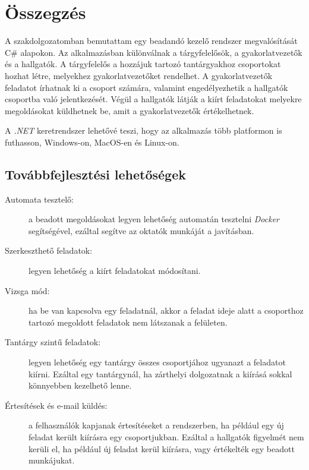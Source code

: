 \chapter{Összegzés} %
\label{ch:sum}
A szakdolgozatomban bemutattam egy beadandó kezelő rendszer megvalósítását C\# alapokon. Az alkalmazásban különválnak a tárgyfelelősök, a gyakorlatvezetők és a hallgatók. A tárgyfelelős a hozzájuk tartozó tantárgyakhoz csoportokat hozhat létre, melyekhez gyakorlatvezetőket rendelhet. A gyakorlatvezetők feladatot írhatnak ki a csoport számára, valamint engedélyezhetik a hallgatók csoportba való jelentkezését. Végül a hallgatók látják a kiírt feladatokat melyekre megoldásokat küldhetnek be, amit a gyakorlatvezetők értékelhetnek.

A \emph{.NET} keretrendszer lehetővé teszi, hogy az alkalmazás több platformon is futhasson, Windows-on, MacOS-en és Linux-on.
\section{Továbbfejlesztési lehetőségek}
\begin{description}
    \item[Automata tesztelő:] a beadott megoldásokat legyen lehetőség automatán tesztelni \emph{Docker} segítségével, ezáltal segítve az oktatók munkáját a javításban.
    \item[Szerkeszthető feladatok:] legyen lehetőség a kiírt feladatokat módosítani.
    \item[Vizsga mód:] ha be van kapcsolva egy feladatnál, akkor a feladat ideje alatt a csoporthoz tartozó megoldott feladatok nem látszanak a felületen.
    \item[Tantárgy szintű feladatok:] legyen lehetőség egy tantárgy összes csoportjához ugyanazt a feladatot kiírni. Ezáltal egy tantárgynál, ha zárthelyi dolgozatnak a kiírásá sokkal könnyebben kezelhető lenne.
    \item[Értesítések és e-mail küldés:] a felhasználók kapjanak értesítéseket a rendszerben, ha például egy új feladat került kiírásra egy csoportjukban. Ezáltal a hallgatók figyelmét nem kerüli el, ha például új feladat kerül kiírásra, vagy értékelték egy beadott munkájukat. 
\end{description}
